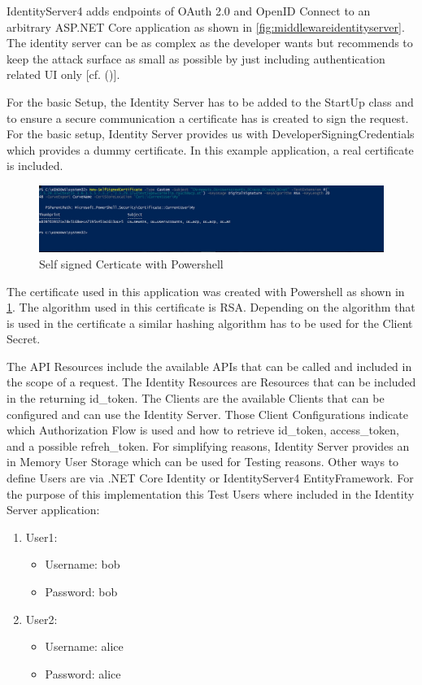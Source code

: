 IdentityServer4 adds endpoints of OAuth 2.0 and OpenID Connect to an arbitrary ASP.NET Core application as shown in \ref{fig:middlewareidentityserver}. The identity server can be as complex as the developer wants but \cite{Brock:2018:ID4} recommends to keep the attack surface as small as possible by just including authentication related UI only [cf. (\cite{Brock:2018:ID4})]. 


For the basic Setup, the Identity Server has to be added to the StartUp class and to ensure a secure communication a certificate has is created to sign the request. For the basic setup, Identity Server provides us with DeveloperSigningCredentials which provides a dummy certificate. In this example application, a real certificate is included. 

\begin{figure}[h]
	\centering
	\includegraphics[width=0.8\linewidth]{images/self-signed-certicate}
	\caption{Self signed Certicate with Powershell}
	\label{fig:self-signed-certicate}
\end{figure}

The certificate used in this application was created with Powershell as shown in \ref{fig:self-signed-certicate}. The algorithm used in this certificate is RSA. Depending on the algorithm that is used in the certificate a similar hashing algorithm has to be used for the Client Secret.


The API Resources include the available APIs that can be called and included in the scope of a request. The Identity Resources are Resources that can be included in the returning id\_token. The Clients are the available Clients that can be configured and can use the Identity Server. Those Client Configurations indicate which Authorization Flow is used and how to retrieve id\_token, access\_token, and a possible refreh\_token. For simplifying reasons, Identity Server provides an in Memory User Storage which can be used for Testing reasons. Other ways to define Users are via .NET Core Identity or IdentityServer4 EntityFramework. For the purpose of this implementation this Test Users where included in the Identity Server application:
\begin{enumerate}
	\item User1:
	\begin{itemize}
		\item  Username: bob
		\item  Password: bob
	\end{itemize} 
	\item User2:
	\begin{itemize}
		\item  Username: alice
		\item  Password: alice
	\end{itemize} 
\end{enumerate}

